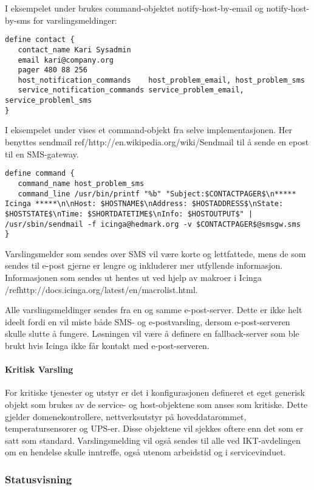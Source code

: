 I eksempelet under brukes command-objektet notify-host-by-email og notify-host-by-sms for varslingsmeldinger:
\begin{lstlisting}
define contact {
   contact_name Kari Sysadmin
   email kari@company.org
   pager 480 88 256 
   host_notification_commands    host_problem_email, host_problem_sms
   service_notification_commands service_problem_email, service_probleml_sms
}
\end{lstlisting}

I eksempelet under vises et command-objekt fra selve implementasjonen. Her benyttes sendmail ref/{http://en.wikipedia.org/wiki/Sendmail} til å sende en epost til en SMS-gateway.

\begin{lstlisting}
define command {
   command_name host_problem_sms
   command_line /usr/bin/printf "%b" "Subject:$CONTACTPAGER$\n***** Icinga *****\n\nHost: $HOSTNAME$\nAddress: $HOSTADDRESS$\nState: $HOSTSTATE$\nTime: $SHORTDATETIME$\nInfo: $HOSTOUTPUT$" | /usr/sbin/sendmail -f icinga@hedmark.org -v $CONTACTPAGER$@smsgw.sms
}
\end{lstlisting}

Varslingsmelder som sendes over SMS vil være korte og lettfattede, mens de som sendes til e-post gjerne er lengre og inkluderer mer utfyllende informasjon. Informasjonen som sendes ut hentes ut ved hjelp av makroer i Icinga /ref{http://docs.icinga.org/latest/en/macrolist.html}. 

Alle varslingsmeldinger sendes fra en og samme e-post-server. Dette er ikke helt ideelt fordi en vil miste både SMS- og e-postvarsling, dersom e-post-serveren skulle slutte å fungere. Løsningen vil være å definere en fallback-server som ble brukt hvis Icinga ikke får kontakt med e-post-serveren. 

\paragraph{Kritisk Varsling}

For kritiske tjenester og utstyr er det i konfigurasjonen defineret et eget generisk objekt som brukes av de service- og host-objektene som anses som kritiske. Dette gjelder domenekontrollere, nettverksutstyr på hoveddatarommet, temperatursensorer og UPS-er. Disse objektene vil sjekkes oftere enn det som er satt som standard. Varslingsmelding vil også sendes til alle ved IKT-avdelingen om en hendelse skulle inntreffe, også utenom arbeidstid og i servicevinduet.

\subsubsection{Statusvisning}


